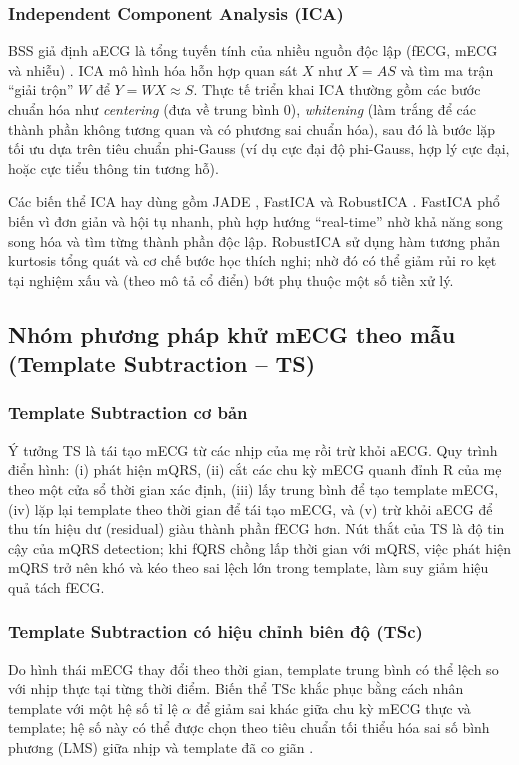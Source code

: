 \documentclass[../DoAn.tex]{subfiles}
\begin{document}
\subsubsection{Independent Component Analysis (ICA)}
BSS giả định aECG là tổng tuyến tính của nhiều nguồn độc lập (fECG, mECG và nhiễu) \cite{cardosoBlindSignalSeparation1998}. ICA mô hình hóa hỗn hợp quan sát $X$ như $X = AS$ và tìm ma trận “giải trộn” $W$ để $Y = WX \approx S$. Thực tế triển khai ICA thường gồm các bước chuẩn hóa như \textit{centering} (đưa về trung bình 0), \textit{whitening} (làm trắng để các thành phần không tương quan và có phương sai chuẩn hóa), sau đó là bước lặp tối ưu dựa trên tiêu chuẩn phi-Gauss (ví dụ cực đại độ phi-Gauss, hợp lý cực đại, hoặc cực tiểu thông tin tương hỗ).

Các biến thể ICA hay dùng gồm JADE \cite{cardosoBlindBeamformingNongaussian1993}, FastICA \cite{hyvarinenIndependentComponentAnalysis2000} và RobustICA \cite{zarzosoRobustIndependentComponent2010}. FastICA phổ biến vì đơn giản và hội tụ nhanh, phù hợp hướng “real-time” nhờ khả năng song song hóa và tìm từng thành phần độc lập. RobustICA sử dụng hàm tương phản kurtosis tổng quát và cơ chế bước học thích nghi; nhờ đó có thể giảm rủi ro kẹt tại nghiệm xấu và (theo mô tả cổ điển) bớt phụ thuộc một số tiền xử lý.

\subsection{Nhóm phương pháp khử mECG theo mẫu (Template Subtraction -- TS)}
\subsubsection{Template Subtraction cơ bản}
Ý tưởng TS là tái tạo mECG từ các nhịp của mẹ rồi trừ khỏi aECG. Quy trình điển hình: (i) phát hiện mQRS, (ii) cắt các chu kỳ mECG quanh đỉnh R của mẹ theo một cửa sổ thời gian xác định, (iii) lấy trung bình để tạo template mECG, (iv) lặp lại template theo thời gian để tái tạo mECG, và (v) trừ khỏi aECG để thu tín hiệu dư (residual) giàu thành phần fECG hơn. Nút thắt của TS là độ tin cậy của mQRS detection; khi fQRS chồng lấp thời gian với mQRS, việc phát hiện mQRS trở nên khó và kéo theo sai lệch lớn trong template, làm suy giảm hiệu quả tách fECG.

\subsubsection{Template Subtraction có hiệu chỉnh biên độ (TSc)}
Do hình thái mECG thay đổi theo thời gian, template trung bình có thể lệch so với nhịp thực tại từng thời điểm. Biến thể TSc khắc phục bằng cách nhân template với một hệ số tỉ lệ $\alpha$ để giảm sai khác giữa chu kỳ mECG thực và template; hệ số này có thể được chọn theo tiêu chuẩn tối thiểu hóa sai số bình phương (LMS) giữa nhịp và template đã co giãn \cite{martensRobustFetalECG2007}.
\end{document}
